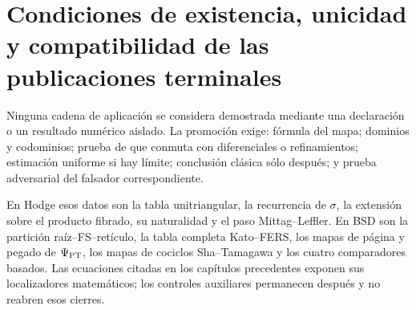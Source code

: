 \section{Condiciones de existencia, unicidad y compatibilidad de las publicaciones terminales}

Ninguna cadena de aplicación se considera demostrada mediante una declaración o un resultado numérico aislado. La
promoción exige: fórmula del mapa; dominios y codominios; prueba de que conmuta
con diferenciales o refinamientos; estimación uniforme si hay límite; conclusión
clásica sólo después; y prueba adversarial del falsador correspondiente.

En Hodge esos datos son la tabla unitriangular, la recurrencia de $\sigma$, la
extensión sobre el producto fibrado, su naturalidad y el paso
Mittag--Leffler. En BSD son la partición raíz--FS--retículo, la tabla completa
Kato--FERS, los mapas de página y pegado de $\Psi_{\rm PT}$, los mapas de
cociclos Sha--Tamagawa y los cuatro comparadores basados. Las ecuaciones citadas en los capítulos precedentes exponen sus localizadores matemáticos; los controles auxiliares permanecen después y no reabren esos cierres.

